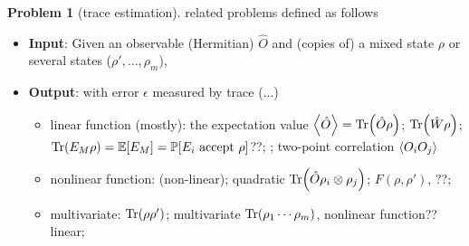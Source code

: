 \documentclass[
10pt,
aps,
pra,
linenumbers,
floatfix,
]{revtex4-2}
\theoremstyle{plain}
\theoremstyle{definition}
\newtheorem{problem}{Problem}
\newcommand{\ew}{\hat{W}}
\newcommand{\ob}{\hat{O}}
\newcommand{\dm}{\rho}
\begin{document}
\begin{problem}[trace estimation]\label{prm:trace_estimation}
	related problems defined as follows
	\begin{itemize}
		\item \textbf{Input}: Given an observable (Hermitian) $\ob$ and (copies of) a mixed state $\dm$ or several states ($\dm',\dots,\dm_m$), 
		\item \textbf{Output}: with error $\epsilon$ measured by trace  (...)
		\begin{itemize}
			\item linear function (mostly):
			the expectation value $\expval{\ob}=\Tr(\ob \dm) $; 
			 $\Tr(\ew\dm)$;
			 $\Tr(E_M\dm) = \expectation[E_M] = \probability[E_i \text{ accept } \dm]$??;
			;
			two-point correlation $\expval{O_iO_j}$

			\item nonlinear function:
			 (non-linear); quadratic $\Tr(\ob \dm_i \otimes \dm_j)$;
			 $F(\dm,\dm')$, ??;

			\item multivariate: 
			 $\Tr(\dm\dm')$;
			multivariate $\Tr(\dm_1 \cdots \dm_m)$, nonlinear function?? linear;
		\end{itemize}
	\end{itemize}
\end{problem}
\end{document}
